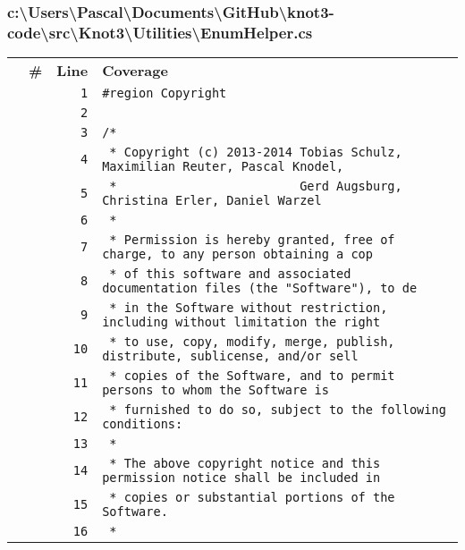 \documentclass[a4paper,10pt]{article}
\begin{document}
\subsubsection{c:\textbackslash Users\textbackslash Pascal\textbackslash Documents\textbackslash GitHub\textbackslash knot3-code\textbackslash src\textbackslash Knot3\textbackslash Utilities\textbackslash EnumHelper.cs}
\begin{longtable}[l]{lrrl}
\textbf{} & \textbf{\#} & \textbf{Line} & \textbf{Coverage}\\
\cellcolor{gray} &  & \verb~1~ & \verb~#region Copyright~\\
\cellcolor{gray} &  & \verb~2~ & \verb~~\\
\cellcolor{gray} &  & \verb~3~ & \verb~/*~\\
\cellcolor{gray} &  & \verb~4~ & \verb~ * Copyright (c) 2013-2014 Tobias Schulz, Maximilian Reuter, Pascal Knodel,~\\
\cellcolor{gray} &  & \verb~5~ & \verb~ *                         Gerd Augsburg, Christina Erler, Daniel Warzel~\\
\cellcolor{gray} &  & \verb~6~ & \verb~ *~\\
\cellcolor{gray} &  & \verb~7~ & \verb~ * Permission is hereby granted, free of charge, to any person obtaining a cop~\\
\cellcolor{gray} &  & \verb~8~ & \verb~ * of this software and associated documentation files (the "Software"), to de~\\
\cellcolor{gray} &  & \verb~9~ & \verb~ * in the Software without restriction, including without limitation the right~\\
\cellcolor{gray} &  & \verb~10~ & \verb~ * to use, copy, modify, merge, publish, distribute, sublicense, and/or sell~\\
\cellcolor{gray} &  & \verb~11~ & \verb~ * copies of the Software, and to permit persons to whom the Software is~\\
\cellcolor{gray} &  & \verb~12~ & \verb~ * furnished to do so, subject to the following conditions:~\\
\cellcolor{gray} &  & \verb~13~ & \verb~ *~\\
\cellcolor{gray} &  & \verb~14~ & \verb~ * The above copyright notice and this permission notice shall be included in ~\\
\cellcolor{gray} &  & \verb~15~ & \verb~ * copies or substantial portions of the Software.~\\
\cellcolor{gray} &  & \verb~16~ & \verb~ *~\\

\end{longtable}
\end{document}
